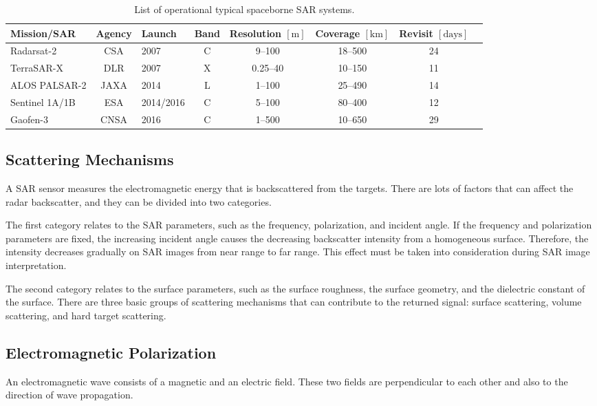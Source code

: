 \setlength{\tabcolsep}{3.0pt}
\begin{table}[!htb]
\caption[List of operational typical spaceborne SAR systems]{\label{tab:spacebornes}List of operational typical spaceborne SAR systems.}
\centering
\setlength{\extrarowheight}{3.0pt} %
\begin{tabular}[t]{lclccccc}
\toprule
\textbf{Mission/SAR} & \textbf{Agency} & \textbf{Launch} & \textbf{Band} & \textbf{Resolution} $\left[\text{m}\right]$ & \textbf{Coverage} $\left[\text{km}\right]$ & \textbf{Revisit} $\left[\text{days}\right]$ \\
\midrule
Radarsat-2 & CSA & 2007 & C & 9--100 & 18--500 & 24 \\
TerraSAR-X & DLR & 2007 & X & 0.25--40 & 10--150 & 11 \\
ALOS PALSAR-2 & JAXA & 2014 & L & 1--100 & 25--490 & 14 \\
Sentinel 1A/1B & ESA & 2014/2016 & C & 5--100 & 80--400 & 12 \\
Gaofen-3 & CNSA & 2016 & C & 1--500 & 10--650 & 29 \\
\bottomrule
\end{tabular}
\end{table}

\subsection{Scattering Mechanisms}
A SAR sensor measures the electromagnetic energy that is backscattered from the targets. 
There are lots of factors that can affect the radar backscatter, and they can be divided into two categories.

The first category relates to the SAR parameters, such as the frequency, polarization, and incident angle. If the frequency and
polarization parameters are fixed, the increasing incident angle causes the decreasing backscatter intensity from a homogeneous surface. 
Therefore, the intensity decreases gradually on SAR images from near range to far range. This effect must be taken into consideration during SAR image
interpretation.

The second category relates to the surface parameters, such as the surface roughness, the surface geometry, and the dielectric constant of the
surface. There are three basic groups of scattering mechanisms that can contribute to the returned signal: surface scattering, volume scattering, and hard target scattering.

\subsection{Electromagnetic Polarization}
An electromagnetic wave consists of a magnetic and an electric field.
These two fields are perpendicular to each other and also to the direction of wave propagation.

